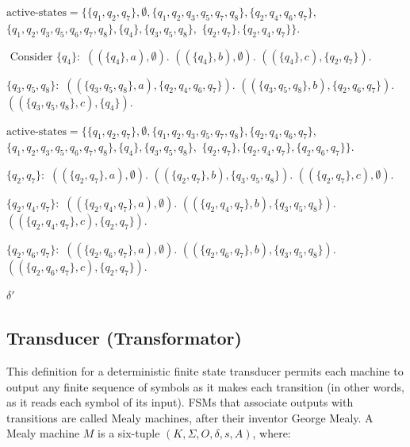 \documentclass[hidelinks,12pt]{article}
\begin{document}
\begin{enumerate}
        $ \text{active-states} = \{\{q_1, q_2, q_7\}, \emptyset, \{q_1, q_2, q_3, q_5, q_7, q_8\}, \{q_2, q_4, q_6, q_7\}, $
        $ \{q_1, q_2, q_3, q_5, q_6, q_7, q_8\}, \{q_4\}, \{q_3, q_5, q_8\}, $
        $ \{q_2, q_7\}, \{q_2, q_4, q_7\}\}.$

        $ \text{ Consider } \{q_4\}: $
        $ ((\{q_4\}, a), \emptyset). $
        $ ((\{q_4\}, b), \emptyset). $
        $ ((\{q_4\}, c), \{q_2, q_7\}). $


         $ \{q_3, q_5, q_8\}:$
        $ ((\{q_3, q_5, q_8\}, a), \{q_2, q_4, q_6, q_7\}). $
        $ ((\{q_3, q_5, q_8\}, b), \{q_2, q_6, q_7\}). $
        $ ((\{q_3, q_5, q_8\}, c), \{q_4\}). $

        $ \text{active-states} = \{\{q_1, q_2, q_7\}, \emptyset, \{q_1, q_2, q_3, q_5, q_7, q_8\}, \{q_2, q_4, q_6, q_7\}, $
        $ \{q_1, q_2, q_3, q_5, q_6, q_7, q_8\}, \{q_4\}, \{q_3, q_5, q_8\}, $
        $ \{q_2, q_7\}, \{q_2, q_4, q_7\}, \{q_2, q_6, q_7\}\}.$ 

         $ \{q_2, q_7\}: $
        $ ((\{q_2, q_7\}, a), \emptyset). $
        $ ((\{q_2, q_7\}, b), \{q_3, q_5, q_8\}). $
        $ ((\{q_2, q_7\}, c), \emptyset). $


         $\{q_2, q_4, q_7\}:$
        $ ((\{q_2, q_4, q_7\}, a), \emptyset). $
        $ ((\{q_2, q_4, q_7\}, b), \{q_3, q_5, q_8\}). $
        $ ((\{q_2, q_4, q_7\}, c), \{q_2, q_7\}). $


         $\{q_2, q_6, q_7\}:$
        $ ((\{q_2, q_6, q_7\}, a), \emptyset). $
        $ ((\{q_2, q_6, q_7\}, b), \{q_3, q_5, q_8\}). $
        $ ((\{q_2, q_6, q_7\}, c), \{q_2, q_7\}). $

         $\delta'$ 
\end{enumerate}

\subsection{Transducer (Transformator)}

This definition for a deterministic finite state transducer permits each
machine to output any finite sequence of symbols as it makes each transition
(in other words, as it reads each symbol of its input).  FSMs that associate
outputs with transitions are called Mealy machines, after their inventor George
Mealy.  A Mealy machine $M$ is a six-tuple $(K, \Sigma, O, \delta, s, A)$, where: 
\end{document}
